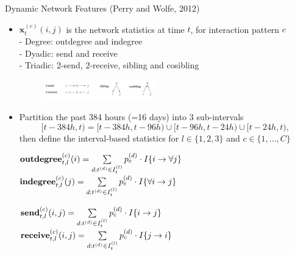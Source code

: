 \documentclass[10pt]{beamer}
\def\bni{\begin{itemize}} \def\ei{\end{itemize}}
\theoremstyle{definition}
\theoremstyle{remark}
\begin{document}
\begin{frame}{Dynamic Network Features (Perry and Wolfe, 2012)}
	\bni
	 \item $\boldsymbol{x}^{(c)}_t(i, j)$ is the network statistics at time $t$, for interaction pattern $c$ \\
	- Degree: outdegree and  indegree\\
 - Dyadic: send and receive \\
 - Triadic: 2-send, 2-receive, sibling and cosibling
	 \begin{figure}
	 	\includegraphics[width=0.45\textwidth]{Triadic.pdf}
	 \end{figure}	
\item Partition the past 384 hours (=16 days) into 3 sub-intervals
 \footnotesize
 \begin{equation*}
 [t-384h,t) = [t-384h, t-96h) \cup [t-96h, t-24h)\cup [t-24h, t),
 \end{equation*}
	 \normalsize
	 then define the interval-based statistics for $l \in \{1,2,3\}$ and $c \in \{1,...,C\}$\\ \vspace{0.4cm}
	 \begin{minipage}{0.49\textwidth}
	 \footnotesize
	  $\mbox{\textbf{outdegree}}^{(c)}_{t, l}(i)=\sum\limits_{d: t^{(d)} \in I_{t}^{(l)}}p_c^{(d)}\cdot I\{i\rightarrow \forall j\}$\\$\mbox{\textbf{indegree}}^{(c)}_{t, l}(j)=\sum\limits_{d: t^{(d)} \in I_{t}^{(l)}}p_c^{(d)}\cdot I\{\forall i \rightarrow j\}$	 
	  \normalsize
	 \end{minipage}
	 	 	 \begin{minipage}{0.44\textwidth}
	 \footnotesize 
	 $\mbox{\textbf{send}}^{(c)}_{t, l}(i, j)=\sum\limits_{d: t^{(d)} \in I_{t}^{(l)}}p_c^{(d)}\cdot I\{i\rightarrow j\}$\\
	  $\mbox{\textbf{receive}}^{(c)}_{t, l}(i, j)=\sum\limits_{d: t^{(d)} \in I_{t}^{(l)}}p_c^{(d)}\cdot I\{j\rightarrow i\}$
	  \normalsize
	 	 		 \end{minipage}
	 \ei
\end{frame}
\end{document}
